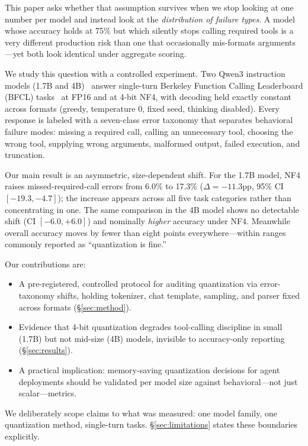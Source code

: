 \documentclass{article}
\begin{document}
This paper asks whether that assumption survives when we stop looking at one
number per model and instead look at the \emph{distribution of failure
types}. A model whose accuracy holds at 75\% but which silently stops calling
required tools is a very different production risk than one that occasionally
mis-formats arguments---yet both look identical under aggregate scoring.

We study this question with a controlled experiment. Two Qwen3 instruction
models (1.7B and 4B)~\citep{yang2025qwen3} answer single-turn
Berkeley Function Calling Leaderboard (BFCL)
tasks~\citep{yan2024bfcl} at FP16 and at 4-bit NF4, with decoding held
exactly constant across formats (greedy, temperature 0, fixed seed, thinking
disabled). Every response is labeled with a seven-class error taxonomy that
separates behavioral failure modes: missing a required call, calling an
unnecessary tool, choosing the wrong tool, supplying wrong arguments,
malformed output, failed execution, and truncation.

Our main result is an asymmetric, size-dependent shift. For the 1.7B model,
NF4 raises missed-required-call errors from 6.0\% to 17.3\%
($\Delta=-11.3$pp, 95\% CI $[-19.3,-4.7]$); the increase appears across all
five task categories rather than concentrating in one. The same comparison in
the 4B model shows no detectable shift (CI $[-6.0,+6.0]$) and nominally
\emph{higher} accuracy under NF4. Meanwhile overall accuracy moves by fewer
than eight points everywhere---within ranges commonly reported as
``quantization is fine.''

Our contributions are:
\begin{itemize}
  \item A pre-registered, controlled protocol for auditing quantization via
  error-taxonomy shifts, holding tokenizer, chat template, sampling, and
  parser fixed across formats (\S\ref{sec:method}).
  \item Evidence that 4-bit quantization degrades tool-calling discipline in
  small (1.7B) but not mid-size (4B) models, invisible to accuracy-only
  reporting (\S\ref{sec:results}).
  \item A practical implication: memory-saving quantization decisions for
  agent deployments should be validated per model size against
  behavioral---not just scalar---metrics.
\end{itemize}

We deliberately scope claims to what was measured: one model family, one
quantization method, single-turn tasks. \S\ref{sec:limitations} states these
boundaries explicitly.
\end{document}
